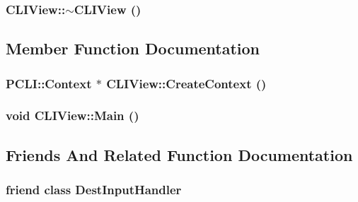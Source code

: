 \hypertarget{classCLIView_a2bfd6634095fd475ef131931aa8790c}{
\subsubsection[{$\sim$CLIView}]{\setlength{\rightskip}{0pt plus 5cm}CLIView::$\sim$CLIView ()}}
\label{classCLIView_a2bfd6634095fd475ef131931aa8790c}




\subsection{Member Function Documentation}
\hypertarget{classCLIView_56c18f1bd74cd25f293012457c7238eb}{
\subsubsection[{CreateContext}]{\setlength{\rightskip}{0pt plus 5cm}PCLI::Context $\ast$ CLIView::CreateContext ()}}
\label{classCLIView_56c18f1bd74cd25f293012457c7238eb}


\hypertarget{classCLIView_e2c5d82a57753fee09f7fd20a14dd0db}{
\subsubsection[{Main}]{\setlength{\rightskip}{0pt plus 5cm}void CLIView::Main ()}}
\label{classCLIView_e2c5d82a57753fee09f7fd20a14dd0db}




\subsection{Friends And Related Function Documentation}
\hypertarget{classCLIView_e9e28ac818dc78f00dff5c15398ff3ae}{
\subsubsection[{DestInputHandler}]{\setlength{\rightskip}{0pt plus 5cm}friend class DestInputHandler}}
\label{classCLIView_e9e28ac818dc78f00dff5c15398ff3ae}


